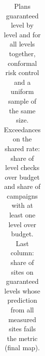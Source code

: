 \documentclass{iopjournal}
\begin{document}
{\renewcommand{\thetable}{S5.4}\small
\begin{longtable}[]{@{}
  >{\raggedright\arraybackslash}p{}
  >{\raggedright\arraybackslash}p{}
  >{\raggedright\arraybackslash}p{}
  >{\raggedright\arraybackslash}p{}
  >{\raggedright\arraybackslash}p{}
  >{\raggedright\arraybackslash}p{}
  >{\raggedright\arraybackslash}p{}@{}}
\caption{Plans guaranteed level by level and for all levels together, conformal risk control and a uniform sample of the same size. Exceedances on the shared rate: share of level checks over budget and share of campaigns with at least one level over budget. Last column: share of sites on guaranteed levels whose prediction from all measured sites fails the metric (final map).}\label{tab:S5.4}\\


\end{longtable}}
\end{document}
